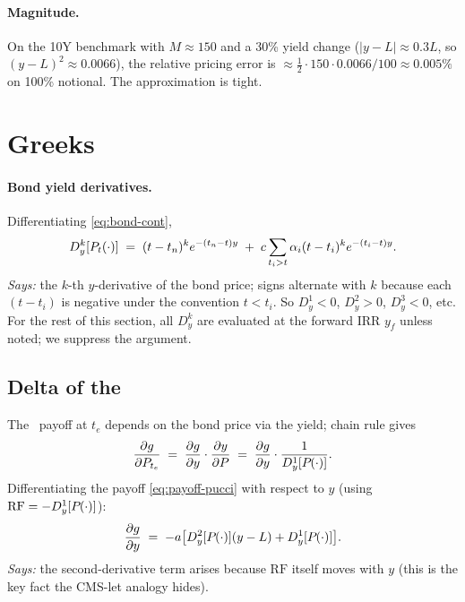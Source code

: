 \documentclass[11pt,a4paper]{article}
\newcommand{\Tlock}{\text{T-Lock}}
\newcommand{\RF}{\mathrm{RF}}
\newcommand{\dD}[1]{D_{y}^{#1}}
\begin{document}
\paragraph{Magnitude.} On the 10Y benchmark with $M \approx 150$ and a
30\% yield change ($|y - L| \approx 0.3 L$, so $(y-L)^2 \approx
0.0066$), the relative pricing error is
$\approx \tfrac12 \cdot 150 \cdot 0.0066 / 100 \approx 0.005\%$ on
100\% notional. The approximation is tight.

\section{Greeks}\label{sec:greeks}

\paragraph{Bond yield derivatives.} Differentiating \eqref{eq:bond-cont},
\begin{equation}\label{eq:bond-derivs}
  \dD{k}[\Bond{t}{\cdot}] \;=\; (t-t_n)^k e^{-(t_n - t)y}
  \;+\; c \sum_{t_i > t} \alpha_i (t - t_i)^k e^{-(t_i - t)y}.
\end{equation}
\textit{Says:} the $k$-th $y$-derivative of the bond price; signs
alternate with $k$ because each $(t - t_i)$ is negative under the
convention $t < t_i$. So $\dD{1} < 0$, $\dD{2} > 0$, $\dD{3} < 0$, etc.
For the rest of this section, all $\dD{k}$ are evaluated at the
forward IRR $y_f$ unless noted; we suppress the argument.

\subsection{Delta of the \Tlock}

The \Tlock\ payoff at $t_e$ depends on the bond price via the yield;
chain rule gives
\begin{equation}\label{eq:delta-derivation}
  \frac{\partial g}{\partial P_{t_e}}
    \;=\; \frac{\partial g}{\partial y} \cdot \frac{\partial y}{\partial P}
    \;=\; \frac{\partial g}{\partial y} \cdot \frac{1}{\dD{1}[\Bond{}{\cdot}]}.
\end{equation}
Differentiating the payoff \eqref{eq:payoff-pucci} with respect to $y$
(using $\RF = -\dD{1}[\Bond{}{\cdot}]$):
\[
  \frac{\partial g}{\partial y}
    \;=\; -a\bigl[ \dD{2}[\Bond{}{\cdot}](y-L) + \dD{1}[\Bond{}{\cdot}] \bigr].
\]
\textit{Says:} the second-derivative term arises because $\RF$ itself
moves with $y$ (this is the key fact the CMS-let analogy hides).
\end{document}
